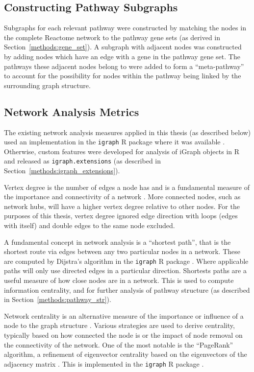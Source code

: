\subsection{Constructing Pathway Subgraphs} \label{methods:subgraphs}
Subgraphs for each relevant pathway were constructed by matching the nodes in the complete Reactome network to the pathway gene sets (as derived in Section~\ref{methods:gene_set}). A subgraph with adjacent nodes was constructed by adding nodes which have an edge with a gene in the pathway gene set. The pathways these adjacent nodes belong to were added to form a ``meta-pathway'' to account for the possibility for nodes within the pathway being linked by the surrounding graph structure.

\subsection{Network Analysis Metrics} \label{methods:network_metrics}
The existing network analysis measures applied in this thesis (as described below) used an implementation in the \texttt{igraph} R package where it was available \citep{igraph}. Otherwise, custom features were developed for analysis of iGraph objects in R and released as \texttt{igraph.extensions} (as described in Section~\ref{methods:igraph_extensions}).

Vertex degree is the number of edges a node has and is a fundamental measure of the importance and connectivity of a network \citep{vanSteen2010}. More connected nodes, such as network hubs, will have a higher vertex degree relative to other nodes. For the purposes of this thesis, vertex degree ignored edge direction with loops (edges with itself) and double edges to the same node excluded.

A fundamental concept in network analysis is a ``shortest path'', that is the shortest route via edges between any two particular nodes in a network. These are computed by Dijstra's algorithm \citep{Dijkstra1959} in the \texttt{igraph} R package \citep{igraph}. Where applicable paths will only use directed edges in a particular direction. Shortests paths are a useful measure of how close nodes are in a network. This is used to compute information centrality, and for further analysis of pathway structure (as described in Section~\ref{methods:pathway_str}).

Network centrality is an alternative measure of the importance or influence of a node to the graph structure \citep{Borgatti2005}. Various strategies are used to derive centrality,  typically based on how connected the node is or the impact of node removal on the connectivity of the network. One of the most notable is the ``PageRank'' algorithm, a refinement of eigenvector centrality based on the eigenvectors of the adjacency matrix \citep{Brin1998}. This is implemented in the \texttt{igraph} R package \citep{igraph}.

